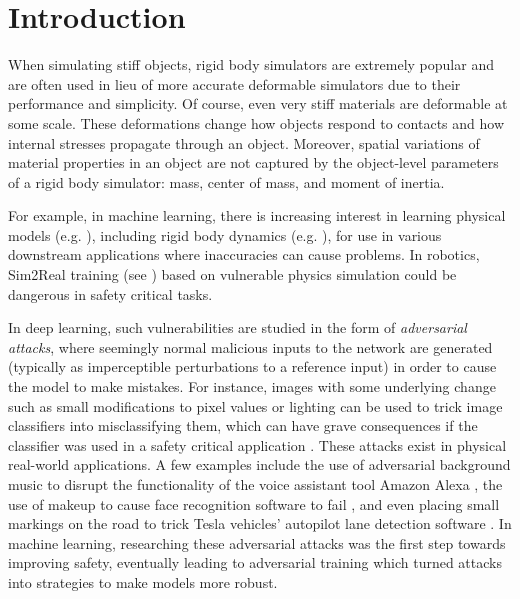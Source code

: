 \section{Introduction}\label{sec:intro}

When simulating stiff objects, rigid body simulators are extremely popular and are often used in lieu of more accurate deformable simulators due to their performance and simplicity. 
Of course, even very stiff materials are deformable at some scale. These deformations change how objects respond to contacts and how internal stresses propagate through an object. Moreover, spatial variations of material properties in an object are not captured by the object-level parameters of a rigid body simulator: mass, center of mass, and moment of inertia. 

For example, in machine learning, there is increasing interest in learning physical models (e.g. \cite{physml1,physml2,physml3,physml4}), including rigid body dynamics (e.g. \cite{rbdml1,rbdml2,rbdml3}), for use in various downstream applications where inaccuracies can cause problems.
In robotics, Sim2Real training (see \cite{sim2real1,sim2real2,sim2real3}) based on vulnerable physics simulation could be dangerous in safety critical tasks.

In deep learning, such vulnerabilities are studied in the form of \emph{adversarial attacks}, where seemingly normal malicious inputs to the network are generated (typically as imperceptible perturbations to a reference input) in order to cause the model to make mistakes. For instance, images with some underlying change such as small modifications to pixel values or lighting can be used to trick image classifiers into misclassifying them, which can have grave consequences if the classifier was used in a safety critical application \cite{chakraborty2021survey, xu2020adversarial}.
These attacks exist in physical real-world applications. A few examples include the use of adversarial background music to disrupt the functionality of the voice assistant tool Amazon Alexa \cite{adv-music}, the use of makeup to cause face recognition software to fail \cite{adv-makeup}, and even placing small markings on the road to trick Tesla vehicles' autopilot lane detection software \cite{keen-lab-tesla}. 
In machine learning, researching these adversarial attacks was the first step towards improving safety, eventually leading to adversarial training which turned attacks into strategies to make models more robust.

